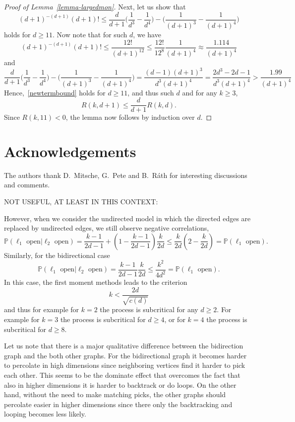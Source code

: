 \documentclass{article}
\theoremstyle{definition}
\newcommand{\1}{\mathbbm{1}}
\newcommand{\0}{\mathbf{o}}
\begin{document}
\begin{proof}[Proof of Lemma~\ref{lemma-largedmon}]
Next, let us show that
\begin{equation}\label{newtermbound} (d+1)^{-(d+1)} (d+1)! \leq \frac{d}{d+1} \big( \frac{1}{d^3}-\frac{1}{d^4} \big) - \Big( \frac{1}{(d+1)^3} - \frac{1}{(d+1)^4} \Big) \end{equation}
holds for $d \geq 11$. Now note that for such $d$, we have
\[ (d+1)^{-(d+1)} (d+1)! \leq \frac{12!}{(d+1)^{12}} \leq \frac{12!}{12^8} \frac{1}{(d+1)^4} \approx \frac{1.114}{(d+1)^4} \]
and
\[ \frac{d}{d+1} \big( \frac{1}{d^3}-\frac{1}{d^4} \big) - \big( \frac{1}{(d+1)^3} - \frac{1}{(d+1)^4} \big) = \frac{(d-1)(d+1)^3}{d^3(d+1)^4} = \frac{2d^3-2d-1}{d^3(d+1)^4} > \frac{1.99}{(d+1)^4} \]
Hence,~\eqref{newtermbound} holds for $d \geq 11$, and thus such $d$ and for any $k\geq 3$,
\[ R(k,d+1) \leq \frac{d}{d+1} R(k,d). \]
Since $R(k,11) < 0$, the lemma now follows by induction over $d$.
\end{proof}

\section*{Acknowledgements}
The authors thank D.~Mitsche, G.~Pete and B.~Ráth for interesting discussions and comments.

\printbibliography



\newpage
NOT USEFUL, AT LEAST IN THIS CONTEXT:

\medskip
However, when we consider the undirected model in which the directed edges are replaced by undirected edges, we still observe negative correlations, 
$$
\mathbb P(\ell_1\text{ open}|\ell_2\text{ open})=\frac{k-1}{2d-1}+(1-\frac{k-1}{2d-1})\frac{k}{2d}\le \frac{k}{2d}(2-\frac{k}{2d})=\mathbb P(\ell_1\text{ open}).
$$
Similarly, for the bidirectional case
$$
\mathbb P(\ell_1\text{ open}|\ell_2\text{ open})=\frac{k-1}{2d-1}\frac{k}{2d}\le\frac{k^2}{4d^2}=\mathbb P(\ell_1\text{ open}).
$$
In this case, the first moment methods leads to the criterion
$$
k<\frac{2d}{\sqrt{c(d)}}
$$
and thus for example for $k=2$ the process is subcritical for any $d\ge 2$. For example for $k=3$ the process is subcritical for $d\ge 4$, or for $k=4$ the process is subcritical for $d\ge 8$.

Let us note that there is a major qualitative difference between the bidirection graph and the both other graphs. For the bidirectional graph it becomes harder to percolate in high dimensions since neighboring vertices find it harder to pick each other. This seems to be the dominate effect that overcomes the fact that also in higher dimensions it is harder to backtrack or do loops. On the other hand, without the need to make matching picks, the other graphs should percolate easier in higher dimensions since there only the backtracking and looping becomes less likely. 
\end{document}
